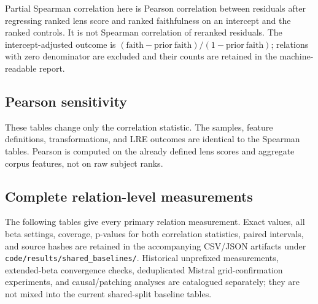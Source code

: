 



Partial Spearman correlation here is Pearson correlation between residuals
after regressing ranked lens score and ranked faithfulness on an intercept
and the ranked controls. It is not Spearman correlation of reranked
residuals. The intercept-adjusted outcome is
$(\mathrm{faith}-\mathrm{prior\ faith})/(1-\mathrm{prior\ faith})$;
relations with zero denominator are excluded and their counts are retained
in the machine-readable report.

\clearpage
\subsection{Pearson sensitivity}
These tables change only the correlation statistic. The samples, feature
definitions, transformations, and LRE outcomes are identical to the
Spearman tables. Pearson is computed on the already defined lens scores
and aggregate corpus features, not on raw subject ranks.





\clearpage
\subsection{Complete relation-level measurements}
The following tables give every primary relation measurement. Exact values,
all beta settings, coverage, p-values for both correlation statistics,
paired intervals, and source hashes are retained in the accompanying CSV/JSON
artifacts under \texttt{code/results/shared\_baselines/}.
Historical unprefixed measurements, extended-beta convergence checks,
deduplicated Mistral grid-confirmation experiments, and causal/patching
analyses are catalogued separately; they are not mixed into the current
shared-split baseline tables.

\clearpage

\clearpage

\clearpage

\clearpage

\clearpage

\clearpage

\clearpage
